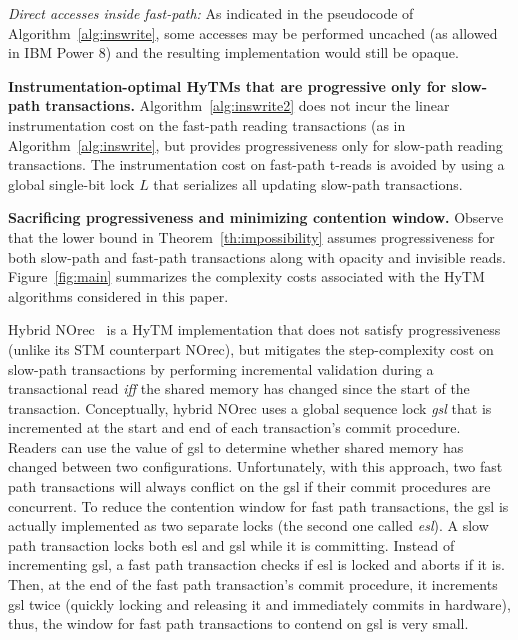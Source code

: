 \vspace{1mm}\noindent\textit{Direct accesses inside fast-path:}
As indicated in the pseudocode of Algorithm~\ref{alg:inswrite}, some accesses may be performed uncached (as allowed
in IBM Power 8) and the resulting implementation would still be opaque. 

\vspace{1mm}\noindent\textbf{Instrumentation-optimal HyTMs that are progressive only for slow-path transactions.}
Algorithm~\ref{alg:inswrite2} does not incur the linear instrumentation cost
on the fast-path reading transactions (as in Algorithm~\ref{alg:inswrite}, but provides progressiveness only
for slow-path reading transactions. The instrumentation cost on fast-path t-reads is avoided by using a global single-bit lock $L$ that serializes all updating slow-path transactions.%

\vspace{1mm}\noindent\textbf{Sacrificing progressiveness and minimizing contention window.}
Observe that the lower bound in Theorem~\ref{th:impossibility} assumes progressiveness for both slow-path and fast-path transactions
along with opacity and invisible reads.
Figure~\ref{fig:main} summarizes the complexity costs
associated with the HyTM algorithms considered in this paper.

Hybrid NOrec~\cite{hybridnorec} is a HyTM implementation that does not satisfy progressiveness
(unlike its STM counterpart NOrec), but mitigates
the step-complexity cost on slow-path transactions by performing incremental validation 
during a transactional read \emph{iff} 
the shared memory has changed since the start of the transaction.
Conceptually, hybrid NOrec uses a global sequence lock \emph{gsl} that is incremented 
at the start and end of each transaction's commit procedure.
Readers can use the value of gsl to determine whether shared memory has changed between two configurations.
Unfortunately, with this approach, two fast path transactions will always conflict on the gsl if their 
commit procedures are concurrent.
To reduce the contention window for fast path transactions, the gsl is actually implemented as two separate locks (the second one called \emph{esl}).
A slow path transaction locks both esl and gsl while it is committing.
Instead of incrementing gsl, a fast path transaction checks if esl is locked and aborts if it is.
Then, at the end of the fast path transaction's commit procedure, 
it increments gsl twice (quickly locking and releasing it and immediately commits in hardware), thus, the 
window for fast path transactions to contend on gsl is very small.
%
%